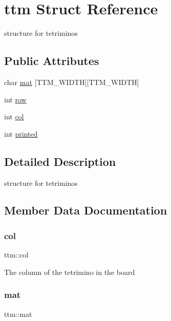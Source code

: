 \hypertarget{structttm}{}\section{ttm Struct Reference}
\label{structttm}


structure for tetriminos  


\subsection*{Public Attributes}
\begin{DoxyCompactItemize}
\item 
char \hyperlink{structttm_ae996fb75cf767777192617821fb94191}{mat} \mbox{[}T\+T\+M\+\_\+\+W\+I\+D\+TH\mbox{]}\mbox{[}T\+T\+M\+\_\+\+W\+I\+D\+TH\mbox{]}
\item 
int \hyperlink{structttm_ad31396b959fc09891926ea70dac0a985}{row}
\item 
int \hyperlink{structttm_a5803d7706ed98e36ccd7c78568ac3c58}{col}
\item 
int \hyperlink{structttm_a576f3b3a777fd0b70e06e8a988fbce00}{printed}
\end{DoxyCompactItemize}


\subsection{Detailed Description}
structure for tetriminos 

\subsection{Member Data Documentation}
\mbox{\label{structttm_a5803d7706ed98e36ccd7c78568ac3c58}} 
\subsubsection{\texorpdfstring{col}{col}}
{\footnotesize\ttfamily ttm\+::col}

The column of the tetrimino in the board \mbox{\label{structttm_ae996fb75cf767777192617821fb94191}} 
\subsubsection{\texorpdfstring{mat}{mat}}
{\footnotesize\ttfamily ttm\+::mat}

